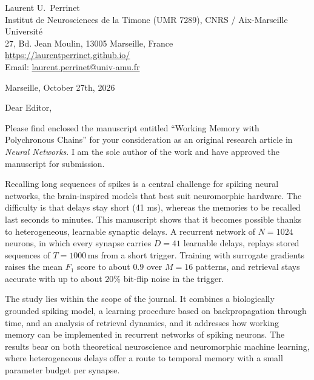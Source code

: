 \documentclass[10pt,british]{article}
\makeatletter
\newcommand{\LastName}{Perrinet}%
\newcommand{\FirstName}{Laurent U.}%
\newcommand{\Institute}{Institut de Neurosciences de la Timone (UMR 7289), CNRS / Aix-Marseille Universit\'e}%
\newcommand{\Address}{27, Bd. Jean Moulin, 13005 Marseille, France}%
\newcommand{\Website}{\url{https://laurentperrinet.github.io/}}%
\newcommand{\Email}{\url{laurent.perrinet@univ-amu.fr}}%
\makeatother
\begin{document}
\begin{flushright}
	\FirstName\ \LastName \\
	\Institute\\[6pt]
	\Address\\
	\Website \\
	Email: \Email \\[6pt]
\end{flushright}

\vspace{2\baselineskip}
Marseille, October 27th, 2026

\vspace{\baselineskip}
Dear Editor,

Please find enclosed the manuscript entitled ``Working Memory with Polychronous Chains'' for your consideration as an original research article in \emph{Neural Networks}. I am the sole author of the work and have approved the manuscript for submission.

Recalling long sequences of spikes is a central challenge for spiking neural networks, the brain-inspired models that best suit neuromorphic hardware. The difficulty is that delays stay short (41 ms), whereas the memories to be recalled last seconds to minutes. This manuscript shows that it becomes possible thanks to heterogeneous, learnable synaptic delays. A recurrent network of $N=1024$ neurons, in which every synapse carries $D=41$ learnable delays, replays stored sequences of $T=1000\,\mathrm{ms}$ from a short trigger. Training with surrogate gradients raises the mean $F_1$ score to about $0.9$ over $M=16$ patterns, and retrieval stays accurate with up to about $20\%$ bit-flip noise in the trigger.

The study lies within the scope of the journal. It combines a biologically grounded spiking model, a learning procedure based on backpropagation through time, and an analysis of retrieval dynamics, and it addresses how working memory can be implemented in recurrent networks of spiking neurons. The results bear on both theoretical neuroscience and neuromorphic machine learning, where heterogeneous delays offer a route to temporal memory with a small parameter budget per synapse.
\end{document}
